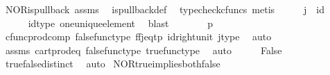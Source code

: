 \begin{isabellebody}
\ NOR{\isacharunderscore}{\kern0pt}is{\isacharunderscore}{\kern0pt}pullback\ assms\ \isamarkupfalse%
\ is{\isacharunderscore}{\kern0pt}pullback{\isacharunderscore}{\kern0pt}def\ \isamarkupfalse%
\ {\isacharparenleft}{\kern0pt}typecheck{\isacharunderscore}{\kern0pt}cfuncs{\isacharcomma}{\kern0pt}\ metis{\isacharparenright}{\kern0pt}\isanewline
\ \ \isamarkupfalse%
\ \isamarkupfalse%
\ {\isachardoublequoteopen}j\ {\isacharequal}{\kern0pt}\ id\ {\isasymone}{\isachardoublequoteclose}\isanewline
\ \ \ \ \isamarkupfalse%
\ id{\isacharunderscore}{\kern0pt}type\ one{\isacharunderscore}{\kern0pt}unique{\isacharunderscore}{\kern0pt}element\ \isamarkupfalse%
\ blast\isanewline
\ \ \isamarkupfalse%
\ \isamarkupfalse%
\ {\isachardoublequoteopen}{\isasymlangle}{\isasymf}{\isacharcomma}{\kern0pt}{\isasymf}{\isasymrangle}\ {\isacharequal}{\kern0pt}\ {\isasymlangle}p{\isacharcomma}{\kern0pt}{\isasymt}{\isasymrangle}{\isachardoublequoteclose}\isanewline
\ \ \ \ \isamarkupfalse%
\ cfunc{\isacharunderscore}{\kern0pt}prod{\isacharunderscore}{\kern0pt}comp\ false{\isacharunderscore}{\kern0pt}func{\isacharunderscore}{\kern0pt}type\ ff{\isacharunderscore}{\kern0pt}j{\isacharunderscore}{\kern0pt}eq{\isacharunderscore}{\kern0pt}tp\ id{\isacharunderscore}{\kern0pt}right{\isacharunderscore}{\kern0pt}unit{}\ j{\isacharunderscore}{\kern0pt}type\ \isamarkupfalse%
\ auto\isanewline
\ \ \isamarkupfalse%
\ \isamarkupfalse%
\ {\isachardoublequoteopen}{\isasymf}\ {\isacharequal}{\kern0pt}\ {\isasymt}{\isachardoublequoteclose}\isanewline
\ \ \ \ \isamarkupfalse%
\ assms\ cart{\isacharunderscore}{\kern0pt}prod{\isacharunderscore}{\kern0pt}eq{}\ false{\isacharunderscore}{\kern0pt}func{\isacharunderscore}{\kern0pt}type\ true{\isacharunderscore}{\kern0pt}func{\isacharunderscore}{\kern0pt}type\ \isamarkupfalse%
\ auto\isanewline
\ \ \isamarkupfalse%
\ \isamarkupfalse%
\ False\isanewline
\ \ \ \ \isamarkupfalse%
\ true{\isacharunderscore}{\kern0pt}false{\isacharunderscore}{\kern0pt}distinct\ \isamarkupfalse%
\ auto\isanewline
{}\isamarkupfalse%
%
\endisatagproof
{\isafoldproof}%
%
\isadelimproof
\isanewline
%
\endisadelimproof
\isanewline
{}\isamarkupfalse%
\ NOR{\isacharunderscore}{\kern0pt}true{\isacharunderscore}{\kern0pt}implies{\isacharunderscore}{\kern0pt}both{\isacharunderscore}{\kern0pt}false{\isacharcolon}{\kern0pt}\isanewline

\end{isabellebody}

